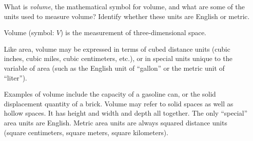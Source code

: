 

What is {\it volume}, the mathematical symbol for volume, and what are some of the units used to measure volume?  Identify whether these units are English or metric.







Volume (symbol: $V$) is the measurement of three-dimensional space.

\vskip 10pt

Like area, volume may be expressed in terms of cubed distance units (cubic inches, cubic miles, cubic centimeters, etc.), or in special units unique to the variable of area (such as the English unit of ``gallon'' or the metric unit of ``liter'').







Examples of volume include the capacity of a gasoline can, or the solid displacement quantity of a brick.  Volume may refer to solid spaces as well as hollow spaces.  It has height and width and depth all together.
The only ``special'' area units are English.  Metric area units are always squared distance units (square centimeters, square meters, square kilometers).




